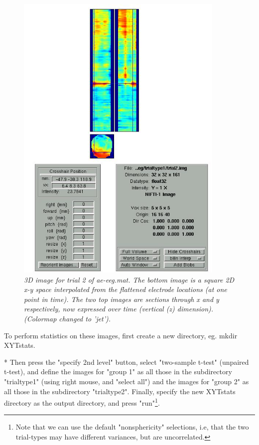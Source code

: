 \begin{figure}
\begin{center}
\includegraphics[width=100mm]{multimodal/figures/figure_32_6}
\caption{\em  3D image for trial 2 of ae-eeg.mat. The bottom image is a square 2D x-y space interpolated from the flattened electrode locations (at one point in time). The two top images are sections through x and y respectively, now expressed over time (vertical (z) dimension). (Colormap changed to 'jet').\label{fig_32_6}}
\end{center}
\end{figure}


To perform statistics on these images, first create a new directory, eg. mkdir XYTstats.

* Then press the "specify 2nd level" button,  select "two-sample t-test" (unpaired t-test), and define the images for "group 1" as all those in the subdirectory "trialtype1" (using right mouse, and "select all") and the images for "group 2" as all those in the subdirectory "trialtype2". Finally, specify the new XYTstats directory as the output directory, and press "run"\footnote{Note that we can use the default "nonsphericity" selections, i.e, that the two trial-types may have different variances, but are uncorrelated.}.



